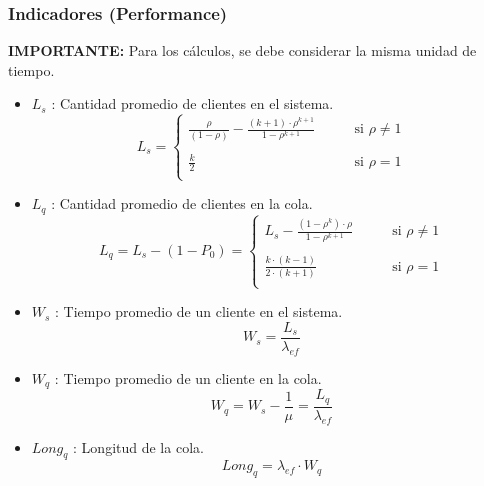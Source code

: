 \documentclass{templateNote}
\begin{document}
\newpage
\subsubsection{Indicadores (Performance)}
\textbf{IMPORTANTE:} Para los cálculos, se debe considerar la misma unidad de tiempo.
\begin{itemize}
    \item $L_s$ : Cantidad promedio de clientes en el sistema.
    \begin{equation*}
        L_s = \begin{cases}
            \displaystyle\frac{\rho}{(1 - \rho)} - \frac{(k + 1)\cdot \rho^{k+1}}{1 - \rho^{k+1}} & \qquad \text{si } \rho \neq 1 \\
            \\
            \displaystyle\frac{k}{2} & \qquad \text{si } \rho = 1 \\
        \end{cases}
    \end{equation*}

    \item $L_q$ : Cantidad promedio de clientes en la cola.
    \begin{equation*}
        L_q = L_s - (1 - P_0) = \begin{cases}
            \displaystyle L_s - \frac{(1 - \rho^k) \cdot \rho}{1 - \rho^{k + 1}} & \qquad \text{si } \rho \neq 1 \\
            \\
            \displaystyle \frac{k \cdot (k - 1)}{2 \cdot (k + 1)} & \qquad \text{si } \rho = 1 \\
        \end{cases}
    \end{equation*}

    \item $W_s$ : Tiempo promedio de un cliente en el sistema.
    \begin{equation*}
        W_s = \frac{L_s}{\lambda_{ef}}
    \end{equation*}

    \item $W_q$ : Tiempo promedio de un cliente en la cola.
    \begin{equation*}
        W_q = W_s - \frac{1}{\mu} = \frac{L_q}{\lambda_{ef}}
    \end{equation*}


    \item $Long_q$ : Longitud de la cola.
    \begin{equation*}
        Long_q = \lambda_{ef} \cdot W_q
    \end{equation*}
\end{itemize}
\end{document}
